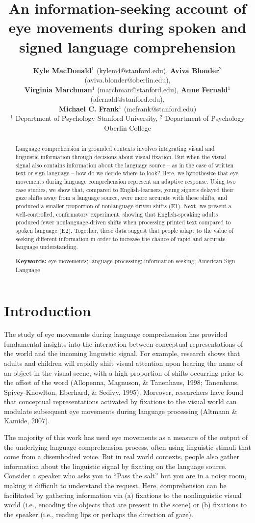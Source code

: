 \documentclass[10pt, letterpaper]{article}
\title{An information-seeking account of eye movements during spoken and signed
language comprehension}
\author{ {\large \bf Kyle MacDonald}$^1$ (kylem4@stanford.edu), {\large \bf Aviva Blonder}$^2$ (aviva.blonder@oberlin.edu), \\ 
  {\large \bf Virginia Marchman}$^1$ (marchman@stanford.edu), {\large \bf Anne Fernald}$^1$ (afernald@stanford.edu), \\ {\large \bf Michael C. Frank}$^1$ (mcfrank@stanford.edu) 
  \\ $^1$ Department of Psychology Stanford University, $^2$ Department of Psychology Oberlin College}
\begin{document}
\maketitle

\begin{abstract}
Language comprehension in grounded contexts involves integrating visual
and linguistic information through decisions about visual fixation. But
when the visual signal also contains information about the language
source -- as in the case of written text or sign language -- how do we
decide where to look? Here, we hypothesize that eye movements during
language comprehension represent an adaptive response. Using two case
studies, we show that, compared to English-learners, young signers
delayed their gaze shifts away from a language source, were more
accurate with these shifts, and produced a smaller proportion of
nonlanguage-driven shifts (E1). Next, we present a well-controlled,
confirmatory experiment, showing that English-speaking adults produced
fewer nonlanguage-driven shifts when processing printed text compared to
spoken language (E2). Together, these data suggest that people adapt to
the value of seeking different information in order to increase the
chance of rapid and accurate language understanding.

\textbf{Keywords:}
eye movements; language processing; information-seeking; American Sign
Language
\end{abstract}

\section{Introduction}\label{introduction}

The study of eye movements during language comprehension has provided
fundamental insights into the interaction between conceptual
representations of the world and the incoming linguistic signal. For
example, research shows that adults and children will rapidly shift
visual attention upon hearing the name of an object in the visual scene,
with a high proportion of shifts occurring prior to the offset of the
word (Allopenna, Magnuson, \& Tanenhaus, 1998; Tanenhaus,
Spivey-Knowlton, Eberhard, \& Sedivy, 1995). Moreover, researchers have
found that conceptual representations activated by fixations to the
visual world can modulate subsequent eye movements during language
processing (Altmann \& Kamide, 2007).

The majority of this work has used eye movements as a measure of the
output of the underlying language comprehension process, often using
linguistic stimuli that come from a disembodied voice. But in real world
contexts, people also gather information about the linguistic signal by
fixating on the language source. Consider a speaker who asks you to
``Pass the salt'' but you are in a noisy room, making it difficult to
understand the request. Here, comprehension can be facilitated by
gathering information via (a) fixations to the nonlinguistic visual
world (i.e., encoding the objects that are present in the scene) or (b)
fixations to the speaker (i.e., reading lips or perhaps the direction of
gaze).
\end{document}
